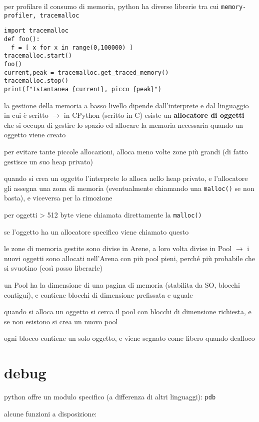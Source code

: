 per profilare il consumo di memoria, python ha diverse librerie tra cui \texttt{memory-profiler, tracemalloc}

\begin{verbatim}
import tracemalloc
def foo():
  f = [ x for x in range(0,100000) ]
tracemalloc.start()
foo()
current,peak = tracemalloc.get_traced_memory()
tracemalloc.stop()
print(f"Istantanea {current}, picco {peak}")
\end{verbatim}

la gestione della memoria a basso livello dipende dall'interprete e dal linguaggio in cui \`e scritto $\rightarrow$ in CPython (scritto in C) esiste un \textbf{allocatore di oggetti} che si occupa di gestire lo spazio ed allocare la memoria necessaria quando un oggetto viene creato

per evitare tante piccole allocazioni, alloca meno volte zone pi\`u grandi (di fatto gestisce un suo heap privato)

quando si crea un oggetto l'interprete lo alloca nello heap privato, e l'allocatore gli assegna una zona di memoria (eventualmente chiamando una \texttt{malloc()} se non basta), e viceversa per la rimozione

per oggetti > 512 byte viene chiamata direttamente la \texttt{malloc()}

se l'oggetto ha un allocatore specifico viene chiamato questo

le zone di memoria gestite sono divise in Arene, a loro volta divise in Pool $\rightarrow$ i nuovi oggetti sono allocati nell'Arena con pi\`u pool pieni, perch\'e pi\`u probabile che si svuotino (cos\`i posso liberarle)

un Pool ha la dimensione di una pagina di memoria (stabilita da SO, blocchi contigui), e contiene blocchi di dimensione prefissata e uguale

quando si alloca un oggetto si cerca il pool con blocchi di dimensione richiesta, e se non esistono si crea un nuovo pool

ogni blocco contiene un solo oggetto, e viene segnato come libero quando dealloco

\section{debug}

python offre un modulo specifico (a differenza di altri linguaggi): \texttt{pdb}

alcune funzioni a disposizione:

